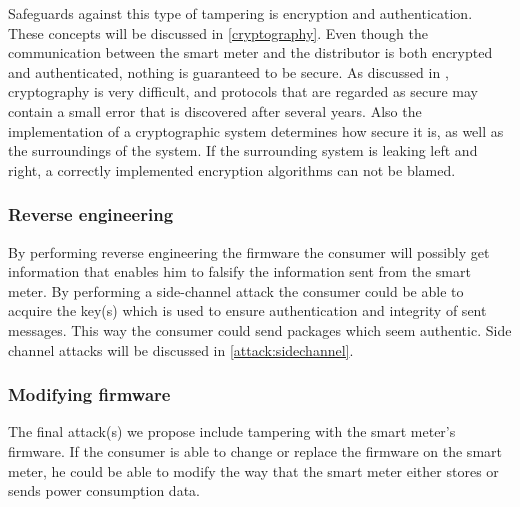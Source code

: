 Safeguards against this type of tampering is encryption and authentication. 
These concepts will be discussed in \cref{cryptography}.
Even though the communication between the smart meter and the distributor is both encrypted and authenticated, nothing is guaranteed to be secure.
As discussed in \citet{cryptoenginering}, cryptography is very difficult, and protocols that are regarded as secure may contain a small error that is discovered after several years.
Also the implementation of a cryptographic system determines how secure it is, as well as the surroundings of the system. \citep{cryptoenginering}
If the surrounding system is leaking left and right, a correctly implemented encryption algorithms can not be blamed.

\subsubsection{Reverse engineering}
By performing reverse engineering the firmware the consumer will possibly get information that enables him to falsify the information sent from the smart meter.
By performing a side-channel attack the consumer could be able to acquire the key(s) which is used to ensure authentication and integrity of sent messages.
This way the consumer could send packages which seem authentic.
Side channel attacks will be discussed in \cref{attack:sidechannel}.

\subsubsection{Modifying firmware}
The final attack(s) we propose include tampering with the smart meter's firmware.
If the consumer is able to change or replace the firmware on the smart meter, he could be able to modify the way that the smart meter either stores or sends power consumption data.
